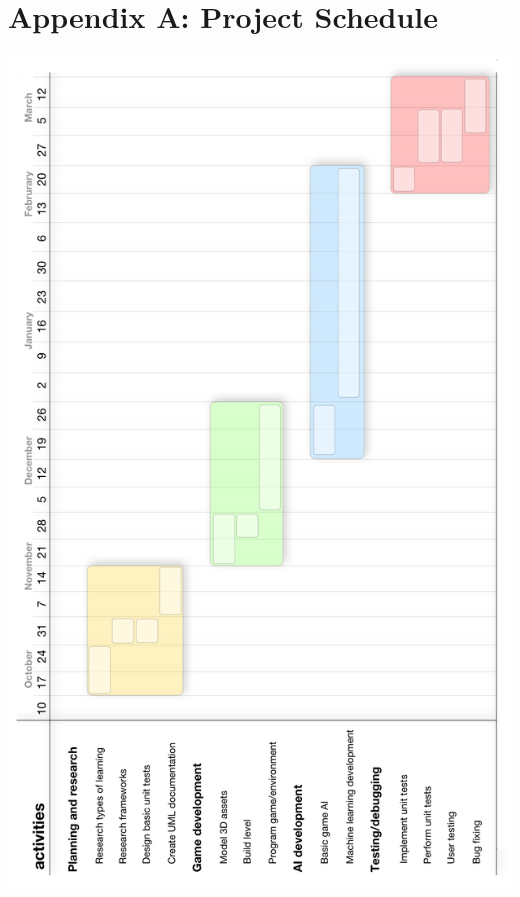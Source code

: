 \documentclass[a4paper,oneside]{report}
\begin{document}
\section{Appendix A: Project Schedule}
\includegraphics[width=140mm]{sources/images/Schedule}
\end{document}
